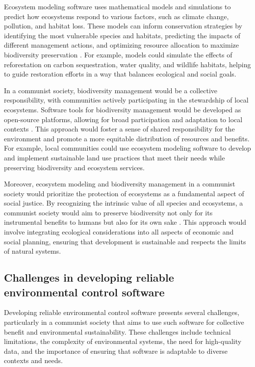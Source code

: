 Ecosystem modeling software uses mathematical models and simulations to predict how ecosystems respond to various factors, such as climate change, pollution, and habitat loss. These models can inform conservation strategies by identifying the most vulnerable species and habitats, predicting the impacts of different management actions, and optimizing resource allocation to maximize biodiversity preservation \cite[pp.~60-67]{grimm2005pattern}. For example, models could simulate the effects of reforestation on carbon sequestration, water quality, and wildlife habitats, helping to guide restoration efforts in a way that balances ecological and social goals.

In a communist society, biodiversity management would be a collective responsibility, with communities actively participating in the stewardship of local ecosystems. Software tools for biodiversity management would be developed as open-source platforms, allowing for broad participation and adaptation to local contexts \cite[pp.~302-309]{turner2007biodiversity}. This approach would foster a sense of shared responsibility for the environment and promote a more equitable distribution of resources and benefits. For example, local communities could use ecosystem modeling software to develop and implement sustainable land use practices that meet their needs while preserving biodiversity and ecosystem services.

Moreover, ecosystem modeling and biodiversity management in a communist society would prioritize the protection of ecosystems as a fundamental aspect of social justice. By recognizing the intrinsic value of all species and ecosystems, a communist society would aim to preserve biodiversity not only for its instrumental benefits to humans but also for its own sake \cite[pp.~410-418]{mace2012biodiversity}. This approach would involve integrating ecological considerations into all aspects of economic and social planning, ensuring that development is sustainable and respects the limits of natural systems.

\subsection{Challenges in developing reliable environmental control software}

Developing reliable environmental control software presents several challenges, particularly in a communist society that aims to use such software for collective benefit and environmental sustainability. These challenges include technical limitations, the complexity of environmental systems, the need for high-quality data, and the importance of ensuring that software is adaptable to diverse contexts and needs.

